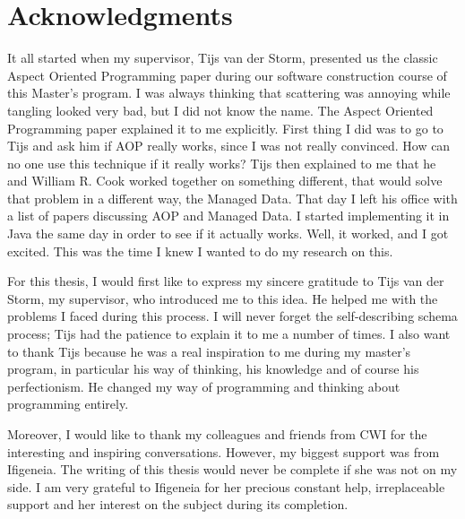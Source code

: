 

\chapter*{Acknowledgments}
It all started when my supervisor, Tijs van der Storm, presented us the classic Aspect Oriented Programming paper during our software construction course of this Master's program.
I was always thinking that scattering was annoying while tangling looked very bad, but I did not know the name. 
The Aspect Oriented Programming paper explained it to me explicitly.
First thing I did was to go to Tijs and ask him if AOP really works, since I was not really convinced.
How can no one use this technique if it really works?
Tijs then explained to me that he and William R. Cook worked together on something different, that would solve that problem in a different way, the Managed Data.
That day I left his office with a list of papers discussing AOP and Managed Data.
I started implementing it in Java the same day in order to see if it actually works.
Well, it worked, and I got excited.
This was the time I knew I wanted to do my research on this.

For this thesis, I would first like to express my sincere gratitude to Tijs van der Storm, my supervisor, who introduced me to this idea.
He helped me with the problems I faced during this process.
I will never forget the self-describing schema process; Tijs had the patience to explain it to me a number of times.
I also want to thank Tijs because he was a real inspiration to me during my master's program, in particular his way of thinking, his knowledge and of course his perfectionism. 
He changed my way of programming and thinking about programming entirely.

Moreover, I would like to thank my colleagues and friends from CWI for the interesting and inspiring conversations.
However, my biggest support was from Ifigeneia.
The writing of this thesis would never be complete if she was not on my side.
I am very grateful to Ifigeneia for her precious constant help, irreplaceable support and her interest on the subject during its completion.

